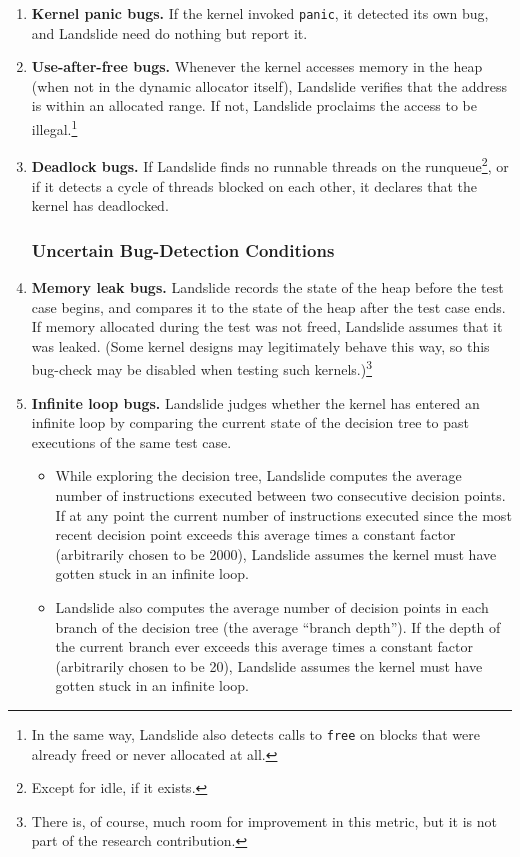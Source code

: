 \begin{enumerate}
	\item {\bf Kernel panic bugs.} If the kernel invoked \texttt{panic}, it detected its own bug, and Landslide need do nothing but report it.
	\item {\bf Use-after-free bugs.} Whenever the kernel accesses memory in the heap (when not in the dynamic allocator itself), Landslide verifies that the address is within an allocated range. If not, Landslide proclaims the access to be illegal.\footnote{In the same way, Landslide also detects calls to \texttt{free} on blocks that were already freed or never allocated at all.}
	\item {\bf Deadlock bugs.} If Landslide finds no runnable threads on the runqueue\footnote{Except for idle, if it exists.}, or if it detects a cycle of threads blocked on each other, it declares that the kernel has deadlocked.

\subsubsection{Uncertain Bug-Detection Conditions}

	\item {\bf Memory leak bugs.} Landslide records the state of the heap before the test case begins, and compares it to the state of the heap after the test case ends. If memory allocated during the test was not freed, Landslide assumes that it was leaked.
		(Some kernel designs may legitimately behave this way, so this bug-check may be disabled when testing such kernels.)\footnote{There is, of course, much room for improvement in this metric, but it is not part of the research contribution.}
	\item {\bf Infinite loop bugs.} Landslide judges whether the kernel has entered an infinite loop by comparing the current state of the decision tree to past executions of the same test case.
	\begin{itemize}
		\item While exploring the decision tree, Landslide computes the average number of instructions executed between two consecutive decision points. If at any point the current number of instructions executed since the most recent decision point exceeds this average times a constant factor (arbitrarily chosen to be 2000), Landslide assumes the kernel must have gotten stuck in an infinite loop.
		\item Landslide also computes the average number of decision points in each branch of the decision tree (the average ``branch depth''). If the depth of the current branch ever exceeds this average times a constant factor (arbitrarily chosen to be 20), Landslide assumes the kernel must have gotten stuck in an infinite loop.
	\end{itemize}
\end{enumerate}


